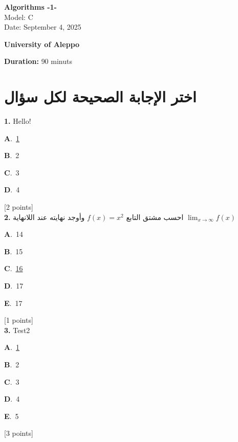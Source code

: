 \documentclass[12pt]{article}
\newcommand{\choice}[3]{%
  \noindent\textbf{#1}.~#2\hfill#3\par\vspace{0.25em}
}
\begin{document}
\begin{flushright}
{\Large \textbf{{\textenglish{Algorithms -1-}}}}\\[0.25em]
{\normalsize \textenglish{Model: }{\textenglish{C}}}\\[0.1em]
{\normalsize \textenglish{Date: }{\textenglish{September 4, 2025}}}
\end{flushright}

\vspace{0.6cm}

\noindent
\begin{minipage}[t]{0.65\textwidth}
  \raggedright
  \textbf{{\textenglish{University of Aleppo}}}\\[0.3em]
\end{minipage}\hfill
\begin{minipage}[t]{0.3\textwidth}
  \raggedleft
  \textenglish{\textbf{Duration: }}{\textenglish{90 minuts}}
\end{minipage}

\vspace{0.9cm}

\section*{اختر الإجابة الصحيحة لكل سؤال}

\noindent \textbf{\textenglish{1.}} {\textenglish{Hello!}}

\noindent\choice{A}{\underline{{\textenglish{1}}}}{}
\noindent\choice{B}{{\textenglish{2}}}{}
\noindent\choice{C}{{\textenglish{3}}}{}
\noindent\choice{D}{{\textenglish{4}}}{}
\hfill {\textenglish{[2 points]}}\\[0.5em]

\noindent \textbf{\textenglish{2.}} {\textarabic{احسب مشتق التابع }}\( f(x) = x^2\){\textarabic{ وأوجد نهايته عند اللانهاية }}\(\lim_{x \to \infty}f(x)\)

\noindent\choice{A}{{\textenglish{14}}}{}
\noindent\choice{B}{{\textenglish{15}}}{}
\noindent\choice{C}{\underline{{\textenglish{16}}}}{}
\noindent\choice{D}{{\textenglish{17}}}{}
\noindent\choice{E}{{\textenglish{17}}}{}
\hfill {\textenglish{[1 points]}}\\[0.5em]

\noindent \textbf{\textenglish{3.}} {\textenglish{Test2}}

\noindent\choice{A}{\underline{{\textenglish{1}}}}{}
\noindent\choice{B}{{\textenglish{2}}}{}
\noindent\choice{C}{{\textenglish{3}}}{}
\noindent\choice{D}{{\textenglish{4}}}{}
\noindent\choice{E}{{\textenglish{5}}}{}
\hfill {\textenglish{[3 points]}}\\[0.5em]
\end{document}
